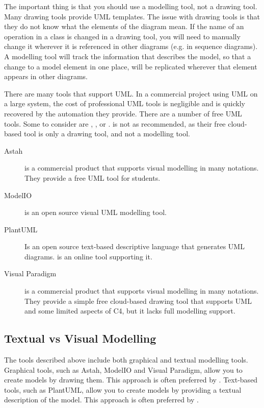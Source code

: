The important thing is that you should use a modelling tool, not a drawing tool.
Many drawing tools provide UML templates.
The issue with drawing tools is that they do not know what the elements of the diagram mean.
If the name of an operation in a class is changed in a drawing tool, you will need to manually change it wherever it is referenced in other diagrams
(e.g. in sequence diagrams).
A modelling tool will track the information that describes the model, so that a change to a model element in one place,
will be replicated wherever that element appears in other diagrams.

There are many tools that support UML.
In a commercial project using UML on a large system, the cost of professional UML tools is negligible and is quickly recovered by the automation they provide.
There are a number of free UML tools. Some to consider are ,
, or .
 is not as recommended, as their free cloud-based tool is only a drawing tool, and not a modelling tool.

\begin{description}
    \item[Astah]
        is a commercial product that supports visual modelling in many notations. They provide a free UML tool for students.
    \item[ModelIO] is an open source visual UML modelling tool.
    \item[PlantUML] Is an open source text-based descriptive language that generates UML diagrams.
         is an online tool supporting it.
    \item[Visual Paradigm] is a commercial product that supports visual modelling in many notations.
        They provide a simple free cloud-based drawing tool that supports UML and some limited aspects of C4, but it lacks full modelling support.
\end{description}

\subsection{Textual vs Visual Modelling}
The tools described above include both graphical and textual modelling tools.
Graphical tools, such as Astah, ModelIO and Visual Paradigm, allow you to create models by drawing them.
This approach is often preferred by .
Text-based tools, such as PlantUML, allow you to create models by providing a textual description of the model.
This approach is often preferred by .

